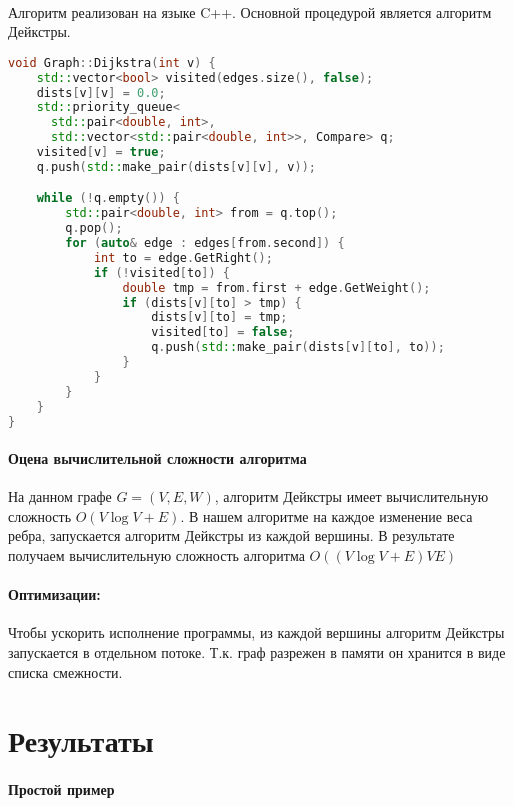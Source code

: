 \documentclass[12pt]{article}
\begin{document}
\paragraph{}
Алгоритм реализован на языке C++. Основной процедурой является
алгоритм Дейкстры\cite{dijkstra}.


\begin{lstlisting}[language=C++]
void Graph::Dijkstra(int v) {
    std::vector<bool> visited(edges.size(), false);
    dists[v][v] = 0.0;
    std::priority_queue<
      std::pair<double, int>,
      std::vector<std::pair<double, int>>, Compare> q;
    visited[v] = true;
    q.push(std::make_pair(dists[v][v], v));

    while (!q.empty()) {
        std::pair<double, int> from = q.top();
        q.pop();
        for (auto& edge : edges[from.second]) {
            int to = edge.GetRight();
            if (!visited[to]) {
                double tmp = from.first + edge.GetWeight();
                if (dists[v][to] > tmp) {
                    dists[v][to] = tmp;
                    visited[to] = false;
                    q.push(std::make_pair(dists[v][to], to));
                }
            }
        }
    }
}
\end{lstlisting}

\paragraph{Оцена вычислительной сложности алгоритма}

На данном графе $G = (V, E, W)$, алгоритм Дейкстры имеет вычислительную  сложность $O(V \log V + E) $.
В нашем алгоритме на каждое изменение веса ребра, запускается алгоритм Дейкстры из каждой вершины. В результате получаем 
вычислительную сложность алгоритма $O((V \log V + E)VE)$

\paragraph{Оптимизации:}
Чтобы ускорить исполнение программы, из каждой
вершины алгоритм Дейкстры запускается в отдельном
потоке. Т.к. граф разрежен в памяти он хранится в
виде списка смежности.

\section{Результаты}

\paragraph{Простой пример}
\end{document}
